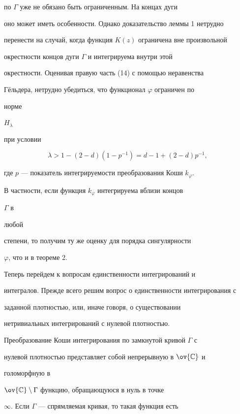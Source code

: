 по $\Gamma$ уже не обязано быть ограниченным. На концах дуги 


оно может иметь особенности. Однако доказательство леммы 1 нетрудно 


перенести на случай, когда функция $K(z)$ ограничена вне произвольной 


окрестности концов дуги $\Gamma$ и интегрируема внутри этой 


окрестности. Оценивая правую часть (14) с помощью неравенства 


Г\"ельдера, нетрудно убедиться, что функционал $\varphi$ ограничен по 


норме 


$H_\lambda$ 


при условии 


\begin{equation} 


\lambda>1-(2-d)(1-p^{-1})=d-1+(2-d)p^{-1}, 


\end{equation} 


где $p$ --- показатель интегрируемости преобразования Коши $k_\varphi$. 


В частности, если функция $k_\varphi$ интегрируема вблизи концов 


$\Gamma$ в 


любой 


степени, то получим ту же оценку для порядка сингулярности 


$\varphi$, что и в теореме 2. 


 


Теперь перейдем к вопросам единственности интегрирований и 


интегралов. Прежде всего решим вопрос о единственности интегрирования с 


заданной плотностью, или, иначе говоря, о существовании 


нетривиальных интегрирований с нулевой плотностью. 


 


Преобразование Коши интегрирования по замкнутой кривой $\Gamma$ с 


нулевой плотностью представляет собой непрерывную в $\ov{\Bbb C}$ и 


голоморфную в 


$\ov{\Bbb C}\setminus\Gamma$ функцию, обращающуюся в нуль в точке 


$\infty$. Если $\Gamma$ --- спрямляемая кривая, то такая функция есть 


